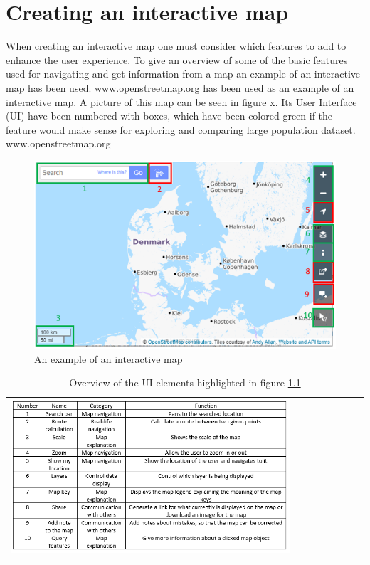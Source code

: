 \chapter{Creating an interactive map}
When creating an interactive map one must consider which features to add to enhance the user experience. To give an overview of some of the basic features used for navigating and get information from a map an example of an interactive map has been used. www.openstreetmap.org has been used as an example of an interactive map. A picture of this map can be seen in figure x. Its User Interface (UI) have been numbered with boxes, which have been colored green if the feature would make sense for exploring and comparing large population dataset.  
www.openstreetmap.org

\begin{figure} [H]
	\centering
	\includegraphics[width=.8\textwidth]{Pictures/InteractiveMap}
	\caption{An example of an interactive map}
	\label{InteractiveMap}
\end{figure}

\begin{table}[htbp]
	\centering
	\begin{tabular}{l}
		\includegraphics[width=0.8\textwidth]{Pictures/tabOSMFunctions}
	\end{tabular}
	\caption{Overview of the UI elements highlighted in figure \ref{InteractiveMap}}
	\label{tabOSMFunctions}
\end{table}

